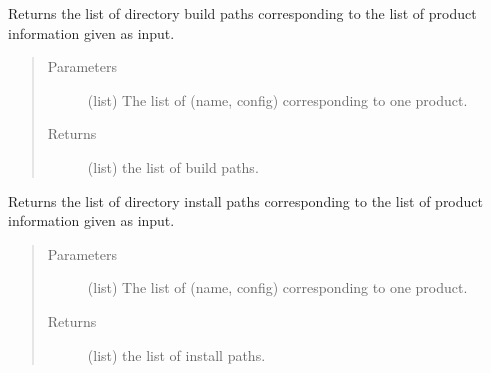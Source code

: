 \documentclass[a4paper,10pt,english]{sphinxmanual}
\begin{document}

\begin{fulllineitems}
\label{\detokenize{apidoc_commands/commands:commands.clean.get_build_directories}}
Returns the list of directory build paths corresponding to the list of 
product information given as input.
\begin{quote}\begin{description}
\item[{Parameters}] \leavevmode
{} \textendash{} (list)
The list of (name, config) corresponding to one product.

\item[{Returns}] \leavevmode
(list) the list of build paths.

\end{description}\end{quote}

\end{fulllineitems}


\begin{fulllineitems}
\label{\detokenize{apidoc_commands/commands:commands.clean.get_install_directories}}
Returns the list of directory install paths corresponding to the list of 
product information given as input.
\begin{quote}\begin{description}
\item[{Parameters}] \leavevmode
{} \textendash{} (list) 
The list of (name, config) corresponding to one product.

\item[{Returns}] \leavevmode
(list) the list of install paths.

\end{description}\end{quote}

\end{fulllineitems}

\end{document}
